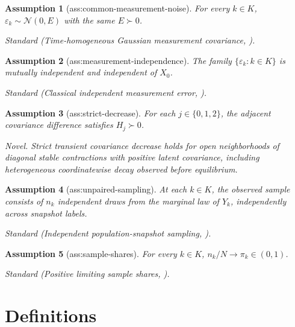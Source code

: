 \documentclass{article}
\newtheorem{assumption}{Assumption}
\begin{document}
\begin{assumption}[ass:common-measurement-noise]\label{ass:common-measurement-noise}
For every \(k\in K\), \(\varepsilon_k\sim\mathcal N(0,E)\) with the same \(E\succ0\).
\par\smallskip\noindent\emph{Standard} (Time-homogeneous Gaussian measurement covariance, \cite{DunikEtAl2017}).
\end{assumption}

\begin{assumption}[ass:measurement-independence]\label{ass:measurement-independence}
The family \(\{\varepsilon_k:k\in K\}\) is mutually independent and independent of \(X_0\).
\par\smallskip\noindent\emph{Standard} (Classical independent measurement error, \cite{DunikEtAl2017}).
\end{assumption}

\begin{assumption}[ass:strict-decrease]\label{ass:strict-decrease}
For each \(j\in\{0,1,2\}\), the adjacent covariance difference satisfies \(H_j\succ0\).
\par\smallskip\noindent\emph{Novel.} Strict transient covariance decrease holds for open neighborhoods of diagonal stable contractions with positive latent covariance, including heterogeneous coordinatewise decay observed before equilibrium.
\end{assumption}

\begin{assumption}[ass:unpaired-sampling]\label{ass:unpaired-sampling}
At each \(k\in K\), the observed sample consists of \(n_k\) independent draws from the marginal law of \(Y_k\), independently across snapshot labels.
\par\smallskip\noindent\emph{Standard} (Independent population-snapshot sampling, \cite{AaltoGoncalves2019}).
\end{assumption}

\begin{assumption}[ass:sample-shares]\label{ass:sample-shares}
For every \(k\in K\), \(n_k/N\to\pi_k\in(0,1)\).
\par\smallskip\noindent\emph{Standard} (Positive limiting sample shares, \cite{KoltchinskiiLounici2017}).
\end{assumption}

\section{Definitions}
\end{document}

